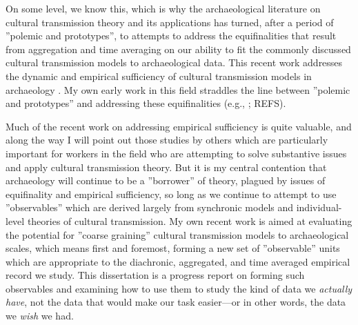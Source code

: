 On some level, we know this, which is why the archaeological literature on cultural transmission theory and its applications has turned, after a period of ''polemic and prototypes'', to attempts to address the equifinalities that result from aggregation and time averaging on our ability to fit the commonly discussed cultural transmission models to archaeological data.  This recent work addresses the dynamic and empirical sufficiency of cultural transmission models in archaeology \citep{Lewontin1974}.  My own early work in this field straddles the line between ''polemic and prototypes'' and addressing these equifinalities (e.g., \citep{Lipo1997}; REFS).    

Much of the recent work on addressing empirical sufficiency is quite valuable, and along the way I will point out those studies by others which are particularly important for workers in the field who are attempting to solve substantive issues and apply cultural transmission theory.  But it is my central contention that archaeology will continue to be a ''borrower'' of theory, plagued by issues of equifinality and empirical sufficiency, so long as we continue to attempt to use ''observables'' which are derived largely from synchronic models and individual-level theories of cultural transmission.  My own recent work is aimed at evaluating the potential for ''coarse graining'' cultural transmission models to archaeological scales, which means first and foremost, forming a new set of ''observable'' units which are appropriate to the diachronic, aggregated, and time averaged empirical record we study.  This dissertation is a progress report on forming such observables and examining how to use them to study the kind of data we \emph{actually have}, not the data that would make our task easier---or in other words, the data we \emph{wish} we had. 
